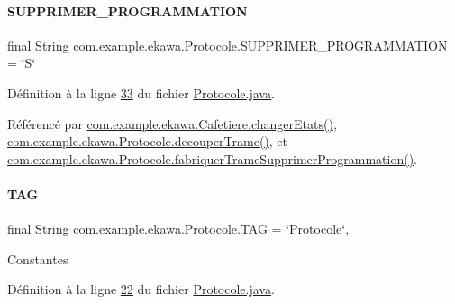 \paragraph{\texorpdfstring{S\+U\+P\+P\+R\+I\+M\+E\+R\+\_\+\+P\+R\+O\+G\+R\+A\+M\+M\+A\+T\+I\+ON}{SUPPRIMER\_PROGRAMMATION}}
{\footnotesize\ttfamily final String com.\+example.\+ekawa.\+Protocole.\+S\+U\+P\+P\+R\+I\+M\+E\+R\+\_\+\+P\+R\+O\+G\+R\+A\+M\+M\+A\+T\+I\+ON = \char`\"{}S\char`\"{}\hspace{0.3cm}{\ttfamily [static]}}



Définition à la ligne \hyperlink{_protocole_8java_source_l00033}{33} du fichier \hyperlink{_protocole_8java_source}{Protocole.\+java}.



Référencé par \hyperlink{_cafetiere_8java_source_l00463}{com.\+example.\+ekawa.\+Cafetiere.\+changer\+Etats()}, \hyperlink{_protocole_8java_source_l00208}{com.\+example.\+ekawa.\+Protocole.\+decouper\+Trame()}, et \hyperlink{_protocole_8java_source_l00193}{com.\+example.\+ekawa.\+Protocole.\+fabriquer\+Trame\+Supprimer\+Programmation()}.

\mbox{\label{classcom_1_1example_1_1ekawa_1_1_protocole_ae9b68fa0daac528421b887f19413f8f5}} 
\paragraph{\texorpdfstring{T\+AG}{TAG}}
{\footnotesize\ttfamily final String com.\+example.\+ekawa.\+Protocole.\+T\+AG = \char`\"{}Protocole\char`\"{}\hspace{0.3cm}{\ttfamily [static]}, {\ttfamily [private]}}

Constantes 

Définition à la ligne \hyperlink{_protocole_8java_source_l00022}{22} du fichier \hyperlink{_protocole_8java_source}{Protocole.\+java}.

\mbox{\label{classcom_1_1example_1_1ekawa_1_1_protocole_aec2265bfb60660cbf5dfb716f694bcfb}} 

